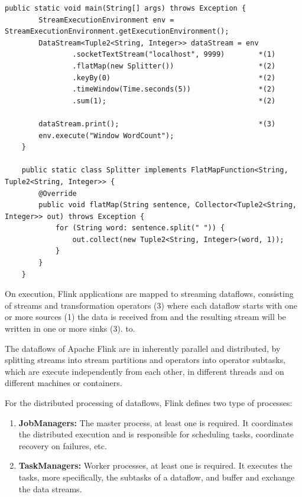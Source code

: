 \begin{lstlisting}[caption={Basic Apache Flink streaming application}, captionpos=b, label={lst:basicflink}]
public static void main(String[] args) throws Exception {
        StreamExecutionEnvironment env = StreamExecutionEnvironment.getExecutionEnvironment();
        DataStream<Tuple2<String, Integer>> dataStream = env
                .socketTextStream("localhost", 9999)        *(1)
                .flatMap(new Splitter())                    *(2)
                .keyBy(0)                                   *(2)
                .timeWindow(Time.seconds(5))                *(2)
                .sum(1);                                    *(2)

        dataStream.print();                                 *(3)
        env.execute("Window WordCount");
    }

    public static class Splitter implements FlatMapFunction<String, Tuple2<String, Integer>> {
        @Override
        public void flatMap(String sentence, Collector<Tuple2<String, Integer>> out) throws Exception {
            for (String word: sentence.split(" ")) {
                out.collect(new Tuple2<String, Integer>(word, 1));
            }
        }
    }
\end{lstlisting}

On execution, Flink applications are mapped to streaming dataflows, consisting of streams
and transformation operators (3) where each dataflow starts with one or more sources (1)
the data is received from and the resulting stream will be written in one or more sinks (3).
to.

The dataflows of Apache Flink are in inherently parallel and distributed, by splitting streams into
stream partitions and operators into operator subtasks, which are execute independently from each
other, in different threads and on different machines or containers.

For the distributed processing of dataflows, Flink defines two type of processes:

\begin{enumerate}
    \item \textbf{JobManagers:} The master process, at least one is required. It coordinates the
    distributed execution and is responsible for scheduling tasks, coordinate recovery
    on failures, etc.
    \item \textbf{TaskManagers:} Worker processes, at least one is required. It executes the tasks, more
    specifically, the subtasks of a dataflow, and buffer and exchange the data streams.
\end{enumerate}

